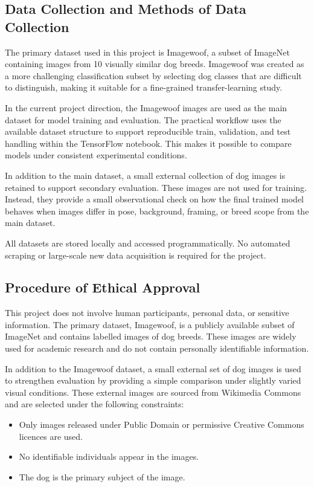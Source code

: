 \documentclass[12pt, a4paper]{article}
\begin{document}
\subsection{Data Collection and Methods of Data Collection}

The primary dataset used in this project is Imagewoof, a subset of ImageNet containing images from 10 visually similar dog breeds. Imagewoof was created as a more challenging classification subset by selecting dog classes that are difficult to distinguish, making it suitable for a fine-grained transfer-learning study.

In the current project direction, the Imagewoof images are used as the main dataset for model training and evaluation. The practical workflow uses the available dataset structure to support reproducible train, validation, and test handling within the TensorFlow notebook. This makes it possible to compare models under consistent experimental conditions.

In addition to the main dataset, a small external collection of dog images is retained to support secondary evaluation. These images are not used for training. Instead, they provide a small observational check on how the final trained model behaves when images differ in pose, background, framing, or breed scope from the main dataset.

All datasets are stored locally and accessed programmatically. No automated scraping or large-scale new data acquisition is required for the project.

\subsection{Procedure of Ethical Approval}

This project does not involve human participants, personal data, or sensitive information. The primary dataset, Imagewoof, is a publicly available subset of ImageNet and contains labelled images of dog breeds. These images are widely used for academic research and do not contain personally identifiable information.

In addition to the Imagewoof dataset, a small external set of dog images is used to strengthen evaluation by providing a simple comparison under slightly varied visual conditions. These external images are sourced from Wikimedia Commons and are selected under the following constraints:

\begin{itemize}
  \item Only images released under Public Domain or permissive Creative Commons licences are used.
  \item No identifiable individuals appear in the images.
  \item The dog is the primary subject of the image.
\end{itemize}
\end{document}
